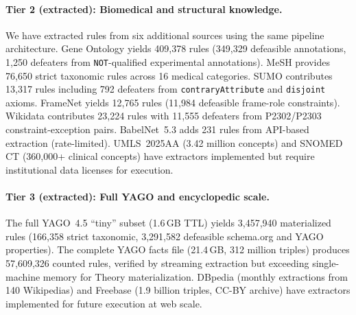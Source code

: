 \documentclass{article}
\theoremstyle{definition}
\begin{document}
\paragraph{Tier 2 (extracted): Biomedical and structural knowledge.}
We have extracted rules from six additional sources using the same pipeline architecture. Gene Ontology \cite{ashburner2000go} yields 409,378 rules (349,329 defeasible annotations, 1,250 defeaters from \texttt{NOT}-qualified experimental annotations). MeSH provides 76,650 strict taxonomic rules across 16 medical categories. SUMO \cite{niles2001sumo} contributes 13,317 rules including 792 defeaters from \texttt{contraryAttribute} and \texttt{disjoint} axioms. FrameNet \cite{baker1998framenet} yields 12,765 rules (11,984 defeasible frame-role constraints). Wikidata \cite{vrandecic2014wikidata} contributes 23,224 rules with 11,555 defeaters from P2302/P2303 constraint-exception pairs. BabelNet~5.3 \cite{navigli2012babelnet} adds 231 rules from API-based extraction (rate-limited). UMLS~2025AA \cite{lindberg1993umls} (3.42 million concepts) and SNOMED CT (360,000+ clinical concepts) have extractors implemented but require institutional data licenses for execution.

\paragraph{Tier 3 (extracted): Full YAGO and encyclopedic scale.}
The full YAGO~4.5 ``tiny'' subset (1.6\,GB TTL) yields 3,457,940 materialized rules (166,358 strict taxonomic, 3,291,582 defeasible schema.org and YAGO properties). The complete YAGO facts file (21.4\,GB, 312 million triples) produces 57,609,326 counted rules, verified by streaming extraction but exceeding single-machine memory for Theory materialization. DBpedia \cite{lehmann2015dbpedia} (monthly extractions from 140 Wikipedias) and Freebase (1.9 billion triples, CC-BY archive) have extractors implemented for future execution at web scale.
\end{document}
